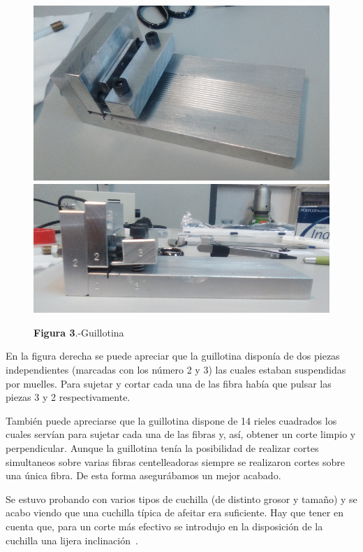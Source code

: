 \begin{figure}[htb]
\centering
{
\includegraphics[scale=0.3]{Guillotina1.png} 
}
{
\includegraphics[scale=0.3]{Guillotina2.png} 
}
\caption{\textbf{Figura 3}.-Guillotina}
\end{figure} 

En la figura derecha se puede apreciar que la guillotina disponía de dos piezas independientes (marcadas con los número 2 y 3) las cuales estaban suspendidas por muelles. Para sujetar y cortar cada una de las fibra había que pulsar las piezas 3 y 2 respectivamente. 

También puede apreciarse que la guillotina dispone de 14 rieles cuadrados los cuales servían para sujetar cada una de las fibras y, así, obtener un corte limpio y perpendicular. Aunque la guillotina tenía la posibilidad de realizar cortes simultaneos sobre varias fibras centelleadoras siempre se realizaron cortes sobre una única fibra. De esta forma asegurábamos un mejor acabado.

Se estuvo probando con varios tipos de cuchilla (de distinto grosor y tamaño) y se acabo viendo que una cuchilla típica de afeitar era suficiente. Hay que tener en cuenta que, para un corte más efectivo se introdujo en la disposición de la cuchilla una lijera inclinación~\cite{anguloytiempo}. 

